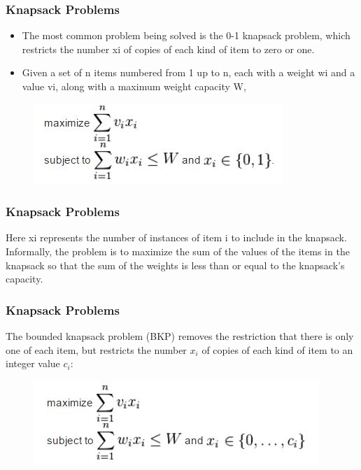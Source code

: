 \documentclass{beamer}
\begin{document}
\begin{frame}
	\frametitle{Knapsack Problems}
	\Large
	\begin{itemize}
	\item The most common problem being solved is the 0-1 knapsack problem, which restricts the number xi of copies of each kind of item to zero or one. 
	\item Given a set of n items numbered from 1 up to n, each with a weight wi and a value vi, along with a maximum weight capacity W,
	\end{itemize}
\begin{figure}
\centering
\includegraphics[width=0.7\linewidth]{01knapsack}
\caption{}
\label{fig:01knapsack}
\end{figure}
\end{frame}
\begin{frame}
	\frametitle{Knapsack Problems}
	\Large
	Here xi represents the number of instances of item i to include in the knapsack. Informally, the problem is to maximize the sum of the values of the items in the knapsack so that the sum of the weights is less than or equal to the knapsack's capacity.
\end{frame}
\begin{frame}
	\frametitle{Knapsack Problems}
\Large
The bounded knapsack problem (BKP) removes the restriction that there is only one of each item, but restricts the number $x_i$ of copies of each kind of item to an integer value $c_i$:
\begin{figure}
\centering
\includegraphics[width=0.7\linewidth]{boundedknapsack}
\caption{}
\label{fig:boundedknapsack}
\end{figure}
\end{frame}
\end{document}
